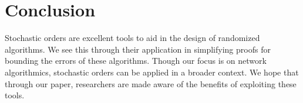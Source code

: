 \section{Conclusion}

Stochastic orders are excellent tools to aid in the design of randomized algorithms. We see this through their
application in simplifying proofs for bounding the errors of these algorithms. Though our focus is on 
network algorithmics, stochastic orders can be applied in a broader context. We hope that through our
paper, researchers are made aware of the benefits of exploiting these tools. 